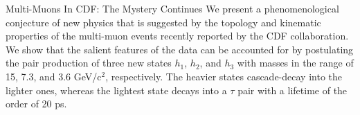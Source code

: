 \begin{multimuons-2}[enhanced, tikz={rotate=0}]{Multi-Muons In CDF: The Mystery Continues}
    We present a phenomenological conjecture of new physics that is suggested
    by the topology and kinematic properties of the multi-muon events recently
    reported by the CDF collaboration. We show that the salient features of 
    the data can be accounted for by postulating the pair production of
    three new states $h_1$, $h_2$, and $h_3$ with masses in the range
    of 15, 7.3, and 3.6 GeV/c$^{2}$, respectively. The heavier states 
    cascade-decay into the lighter ones, whereas the lightest state 
    decays into a $\tau$ pair with a lifetime of the order of 20 ps.

\end{multimuons-2}
